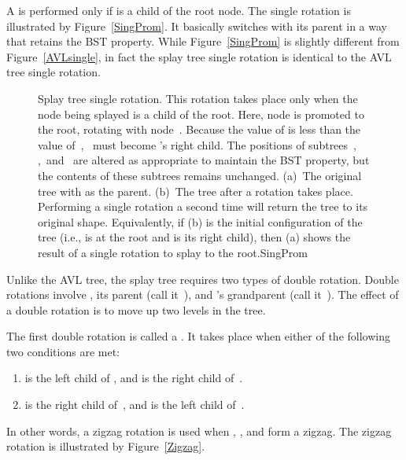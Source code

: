 A  is performed only if 
is a child of the root node.
The single rotation is illustrated by Figure~\ref{SingProm}.
It basically switches  with its parent in a way that
retains the BST property.
While Figure~\ref{SingProm} is slightly different from
Figure~\ref{AVLsingle}, in fact the splay tree single rotation is
identical to the AVL tree single rotation.

\begin{figure}
\vspace{-\smallskipamount}

{Splay tree single rotation.
This rotation takes place only when the node being splayed is a
child of the root.
Here, node  is promoted to the root, rotating with
node~.
Because the value of  is less than the value of~,
~must become 's right child.
The positions of subtrees~, ,~and~ are altered
as appropriate to maintain the BST property, but the contents of these
subtrees remains unchanged.
(a)~The original tree with  as the parent.
(b)~The tree after a rotation takes place.
Performing a single rotation a second time will return the tree to its
original shape.
Equivalently, if (b) is the initial configuration of the tree
(i.e.,  is at the root and  is its right child),
then (a) shows the result of a single rotation to splay  to
the root.}{SingProm}
\bigskip
\end{figure}

Unlike the AVL tree, the splay tree requires two types of
double rotation.
Double rotations involve , its parent (call it~),
and 's grandparent (call it~).
The effect of a double rotation is to move  up two levels in
the tree.

The first double rotation is called a .
It takes place when either of the following two conditions are met:

\begin{enumerate}
\item
{} is the left child of , and  is the right
child of~.

\item
{} is the right child of~, and  is the left
child of~.
\end{enumerate}

\noindent In other words, a zigzag rotation is used when ,
, and  form a zigzag.
The zigzag rotation is illustrated by Figure~\ref{Zigzag}.


